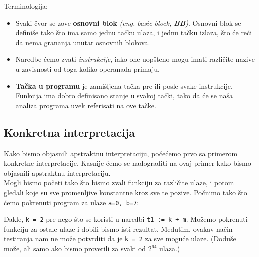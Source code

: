 Terminologija:
\begin{itemize}
\item Svaki čvor se zove \textbf{osnovni blok} \emph{(eng. basic block, \textbf{BB})}. Osnovni blok se definiše tako što ima samo jednu tačku ulaza, i jednu tačku izlaza, što će reći da nema grananja unutar osnovnih blokova.
\item Naredbe ćemo zvati \emph{instrukcije}, iako one uopšteno mogu imati različite nazive u zavisnosti od toga koliko operanada primaju.
\item \textbf{Tačka u programu} je zamišljena tačka pre ili posle svake instrukcije. Funkcija ima dobro definisano stanje u svakoj tački, tako da će se naša analiza programa uvek referisati na ove tačke.
\end{itemize}


\subsection{Konkretna interpretacija}
\label{subsec:concreteimpr}
Kako bismo objasnili apstraktnu interpretaciju, počećemo prvo sa primerom konkretne interpretacije.
Kasnije ćemo se nadograditi na ovaj primer kako bismo objasnili apstraktnu interpretaciju. \\
Mogli bismo početi tako što bismo zvali funkciju za različite ulaze, i potom gledali koje su sve promenljive konstantne
kroz sve te pozive. Počnimo tako što ćemo pokrenuti program za ulaze \texttt{a=0, b=7}:

Dakle, \texttt{k = 2} pre nego što se koristi u naredbi \texttt{t1 := k + m}. Možemo pokrenuti funkciju za ostale ulaze i dobili bismo isti rezultat.
Međutim, ovakav način testiranja nam ne može potvrditi da je \texttt{k = 2} za sve moguće ulaze. (Doduše može, ali samo ako bismo proverili za svaki od $2^{64}$ ulaza.)


